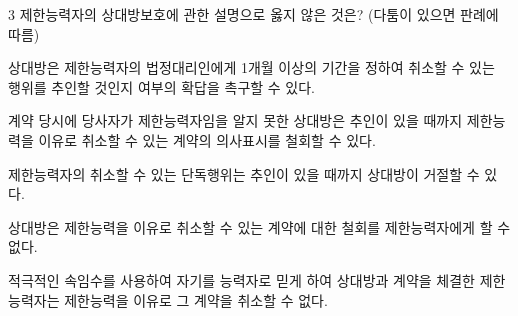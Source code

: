 \begin{question}{3}
제한능력자의 상대방보호에 관한 설명으로 옳지 않은 것은? (다툼이 있으면 판례에 따름)
\begin{choices}
  \item 상대방은 제한능력자의 법정대리인에게 1개월 이상의 기간을 정하여 취소할 수 있는 행위를 추인할 것인지 여부의 확답을 촉구할 수 있다.
  \item 계약 당시에 당사자가 제한능력자임을 알지 못한 상대방은 추인이 있을 때까지 제한능력을 이유로 취소할 수 있는 계약의 의사표시를 철회할 수 있다.
  \item 제한능력자의 취소할 수 있는 단독행위는 추인이 있을 때까지 상대방이 거절할 수 있다.
  \item 상대방은 제한능력을 이유로 취소할 수 있는 계약에 대한 철회를 제한능력자에게 할 수 없다.
  \item 적극적인 속임수를 사용하여 자기를 능력자로 믿게 하여 상대방과 계약을 체결한 제한능력자는 제한능력을 이유로 그 계약을 취소할 수 없다.
\end{choices}
\end{question}
